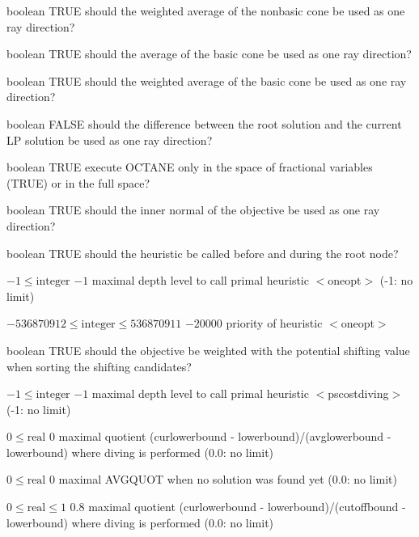 %
{boolean}%
{TRUE}%
{should the weighted average of the nonbasic cone be used as one ray direction?}%
{}

%
{boolean}%
{TRUE}%
{should the average of the basic cone be used as one ray direction?}%
{}

%
{boolean}%
{TRUE}%
{should the weighted average of the basic cone be used as one ray direction?}%
{}

%
{boolean}%
{FALSE}%
{should the difference between the root solution and the current LP solution be used as one ray direction?}%
{}

%
{boolean}%
{TRUE}%
{execute OCTANE only in the space of fractional variables (TRUE) or in the full space? }%
{}

%
{boolean}%
{TRUE}%
{should the inner normal of the objective be used as one ray direction?}%
{}

%
{boolean}%
{TRUE}%
{should the heuristic be called before and during the root node?}%
{}

%
{$-1\leq\textrm{integer}$}%
{$-1$}%
{maximal depth level to call primal heuristic $<$oneopt$>$ (-1: no limit)}%
{}

%
{$-536870912\leq\textrm{integer}\leq536870911$}%
{$-20000$}%
{priority of heuristic $<$oneopt$>$}%
{}

%
{boolean}%
{TRUE}%
{should the objective be weighted with the potential shifting value when sorting the shifting candidates?}%
{}

%
{$-1\leq\textrm{integer}$}%
{$-1$}%
{maximal depth level to call primal heuristic $<$pscostdiving$>$ (-1: no limit)}%
{}

%
{$0\leq\textrm{real}$}%
{$0$}%
{maximal quotient (curlowerbound - lowerbound)/(avglowerbound - lowerbound) where diving is performed (0.0: no limit)}%
{}

%
{$0\leq\textrm{real}$}%
{$0$}%
{maximal AVGQUOT when no solution was found yet (0.0: no limit)}%
{}

%
{$0\leq\textrm{real}\leq1$}%
{$0.8$}%
{maximal quotient (curlowerbound - lowerbound)/(cutoffbound - lowerbound) where diving is performed (0.0: no limit)}%
{}

